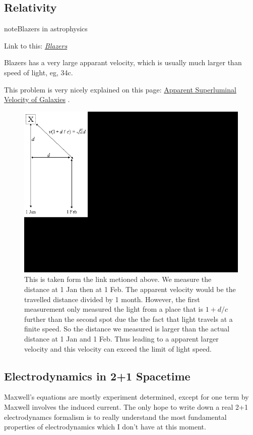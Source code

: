 \documentclass[letterpaper,10pt,english]{sphinxmanual}
\begin{document}
\subsection{Relativity}
\label{fun:relativity}
\begin{notice}{note}{Blazers in astrophysics}

Link to this: {\hyperref[fun:blazers]{\emph{Blazers}}}

Blazers has a very large apparant velocity, which is usually much larger than speed of light, eg, 34c.

This problem is very nicely explained on this page: \href{http://math.ucr.edu/home/baez/physics/Relativity/SpeedOfLight/Superluminal/superluminal.html}{Apparent Superluminal Velocity of Galaxies} .
\begin{figure}[htbp]
\centering
\capstart

\includegraphics{superluminal.gif}
\caption{This is taken form the link metioned above. We measure the distance at 1 Jan then at 1 Feb. The apparent velocity would be the travelled distance divided by 1 month. However, the first measurement only measured the light from a place that is \(1+d/c\) further than the second spot due the the fact that light travels at a finite speed. So the distance we measured is larger than the actual distance at 1 Jan and 1 Feb. Thus leading to a apparent larger velocity and this velocity can exceed the limit of light speed.}\end{figure}
\end{notice}


\subsection{Electrodynamics in 2+1 Spacetime}
\label{fun:electrodynamics-in-2-1-spacetime}
Maxwell's equations are mostly experiment determined, except for one term by Maxwell involves the induced current. The only hope to write down a real 2+1 electrodynamcs formalism is to really understand the most fundamental properties of electrodynamics which I don't have at this moment.
\end{document}

